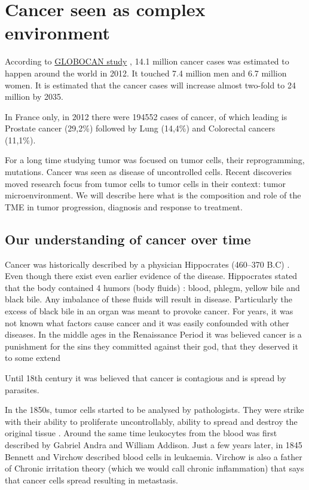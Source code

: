 \documentclass[12pt,]{book}
\theoremstyle{definition}
\theoremstyle{definition}
\theoremstyle{definition}
\theoremstyle{remark}
\begin{document}
\hypertarget{cancer-seen-as-complex-environment}{%
\section{Cancer seen as complex
environment}\label{cancer-seen-as-complex-environment}}

According to
\href{http://globocan.iarc.fr/Pages/fact_sheets_cancer.aspx}{GLOBOCAN
study} \citep{GLOBOCAN}, 14.1 million cancer cases was estimated to
happen around the world in 2012. It touched 7.4 million men and 6.7
million women. It is estimated that the cancer cases will increase
almost two-fold to 24 million by 2035.

In France only, in 2012 there were 194552 cases of cancer, of which
leading is Prostate cancer (29,2\%) followed by Lung (14,4\%) and
Colorectal cancers (11,1\%).

For a long time studying tumor was focused on tumor cells, their
reprogramming, mutations. Cancer was seen as disease of uncontrolled
cells. Recent discoveries moved research focus from tumor cells to tumor
cells in their context: tumor microenvironment. We will describe here
what is the composition and role of the TME in tumor progression,
diagnosis and response to treatment.

\hypertarget{our-understanding-of-cancer-over-time}{%
\subsection{Our understanding of cancer over
time}\label{our-understanding-of-cancer-over-time}}

Cancer was historically described by a physician Hippocrates (460--370
B.C) \citep{Sudhakar2009}. Even though there exist even earlier evidence
of the disease. Hippocrates stated that the body contained 4 humors
(body fluids) : blood, phlegm, yellow bile and black bile. Any imbalance
of these fluids will result in disease. Particularly the excess of black
bile in an organ was meant to provoke cancer. For years, it was not
known what factors cause cancer and it was easily confounded with other
diseases. In the middle ages in the Renaissance Period it was believed
cancer is a punishment for the sins they committed against their god,
that they deserved it to some extend

Until 18th century it was believed that cancer is contagious and is
spread by parasites.

In the 1850s, tumor cells started to be analysed by pathologists. They
were strike with their ability to proliferate uncontrollably, ability to
spread and destroy the original tissue \citep{NPR2010}. Around the same
time leukocytes from the blood was first described by Gabriel Andra and
William Addison. Just a few years later, in 1845 Bennett and Virchow
described blood cells in leukaemia. Virchow is also a father of Chronic
irritation theory (which we would call chronic inflammation) that says
that cancer cells spread resulting in metastasis.
\end{document}
